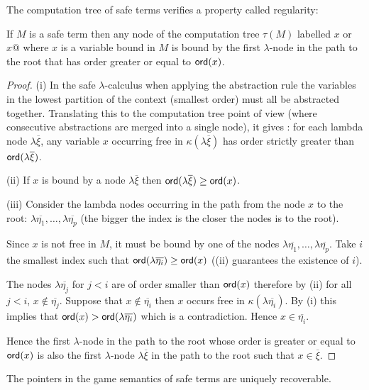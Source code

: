 The computation tree of safe terms verifies a property called regularity:
\begin{property}
\label{proper:regularity}
If $M$ is a safe term then any node of the computation tree $\tau(M)$ labelled $x$ or $x@$ where
$x$ is a variable bound in $M$ is bound by the first $\lambda$-node in the path to the root that has
order greater or equal to ${\sf ord}(x)$.
\end{property}
\begin{proof}
(i) In the safe $\lambda$-calculus when applying the abstraction rule the variables in the lowest partition of the context
(smallest order) must all be abstracted together. Translating this to the computation tree point of view
(where consecutive abstractions are merged into a single node), it gives :
for each lambda node $\lambda \overline{\xi}$, any variable $x$ occurring free in $\kappa(\lambda \overline{\xi})$
has order strictly greater than ${\sf ord}(\lambda \overline{\xi})$.

(ii) If $x$ is bound by a node $\lambda \overline{\xi}$ then
${\sf ord}(\lambda \overline{\xi}) \geq {\sf ord}(x)$.

(iii) Consider the lambda nodes occurring in the path from the node $x$ to the root:
$\lambda \overline{\eta_1}, \ldots, \lambda \overline{\eta_p}$
(the bigger the index is the closer the nodes is to the root).

Since $x$ is not free in $M$, it must be bound by one of the nodes
$\lambda \overline{\eta_1}, \ldots, \lambda \overline{\eta_p}$.
Take $i$ the smallest index such that ${\sf ord}(\lambda \overline{\eta_i}) \geq {\sf ord}(x)$ ((ii) guarantees the existence of $i$).

The nodes $\lambda \overline{\eta_j}$ for $j<i$ are of order smaller than ${\sf ord}(x)$ therefore
by (ii) for all $j<i$, $x \not\in \overline{\eta_j}$. Suppose that $x \not\in \overline{\eta_i}$ then $x$ occurs free in
$\kappa(\lambda \overline{\eta_i})$. By (i) this implies that
${\sf ord}(x) > {\sf ord}(\lambda \overline{\eta_i})$ which is a contradiction.
Hence $x \in \overline{\eta_i}$.

Hence the first $\lambda$-node in the path to the root whose order is greater or equal to ${\sf ord}(x)$
is also the first $\lambda$-node $\lambda \overline{\xi}$ in the path to the root such that $x \in \overline{\xi}$.
\end{proof}


\begin{prop}
The pointers in the game semantics of safe terms are
uniquely recoverable.
\end{prop}


